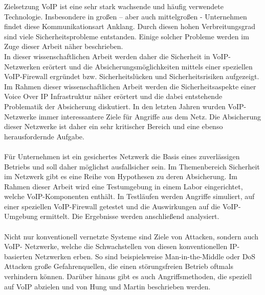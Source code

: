 ﻿\label{Zielsetzung}
\begin{section}{Zielsetzung}	
		\ac{VoIP} ist eine sehr stark wachsende und häufig verwendete Technologie.
		Insbesondere in großen – aber auch mittelgroßen - Unternehmen findet diese Kommunikationsart Anklang.
		Durch diesen hohen Verbreitungsgrad sind viele Sicherheitsprobleme entstanden.
		Einige solcher Probleme werden im Zuge dieser Arbeit näher beschrieben.\\
		
		In dieser wissenschaftlichen Arbeit werden daher die Sicherheit in VoIP-Netzwerken erörtert 
		und die Absicherungsmöglichkeiten mittels einer speziellen VoIP-Firewall ergründet bzw. 
		Sicherheitslücken und Sicherheitsrisiken aufgezeigt.
	\\
		Im Rahmen dieser wissenschaftlichen Arbeit werden die Sicherheitsaspekte einer 
		Voice Over IP Infrastruktur näher erörtert und die dabei entstehende Problematik der Absicherung diskutiert.
		In den letzten Jahren wurden VoIP-Netzwerke immer interessantere Ziele für Angriffe aus dem Netz.
		Die Absicherung dieser Netzwerke ist daher ein sehr kritischer Bereich und eine ebenso herausfordernde Aufgabe.\\
	\\
		Für Unternehmen ist ein gesichertes Netzwerk die Basis eines zuverlässigen Betriebs und 
		soll daher möglichst ausfallsicher sein.
		Im Themenbereich Sicherheit im Netzwerk gibt es eine Reihe von Hypothesen zu deren Absicherung.
	 	Im Rahmen dieser Arbeit wird eine Testumgebung in einem Labor eingerichtet, 
		welche VoIP-Komponenten enthält. In Testläufen werden Angriffe simuliert, 
		auf einer speziellen VoIP-Firewall getestet und die Auswirkungen auf die VoIP-Umgebung ermittelt.
		Die Ergebnisse werden anschließend analysiert.\\
	\\
		Nicht nur konventionell vernetzte Systeme sind Ziele von Attacken, sondern auch VoIP- Netzwerke,
		welche die Schwachstellen von diesen konventionellen IP-basierten Netzwerken erben.
		So sind beispielsweise Man-in-the-Middle oder \ac{DoS} 
		Attacken große Gefahrenquellen, die einen störungsfreien Betrieb oftmals verhindern können. 
		Darüber hinaus gibt es auch Angriffsmethoden, die speziell auf VoIP 
		abzielen und von Hung und Martin \cite{Hung:2006:seciss} beschrieben werden.
		\\ 

\end{section}
\pagebreak

